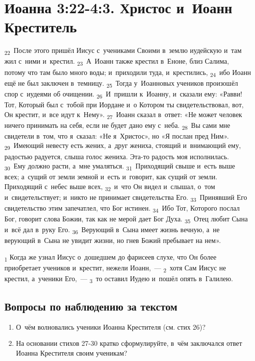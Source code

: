 \documentclass[a4paper,12pt]{article}
\begin{document}

\section{Иоанна 3:22-4:3. Христос и~Иоанн Креститель}

\textsubscript{22}~После этого пришёл Иисус с~учениками Своими в~землю иудейскую и~там жил с~ними и~крестил.
\textsubscript{23}~А~Иоанн также крестил в~Еноне, близ Салима, потому что там было много воды; и~приходили туда, и~крестились,
\textsubscript{24}~ибо Иоанн ещё не был заключен в~темницу.
\textsubscript{25}~Тогда у~Иоанновых учеников произошёл спор с~иудеями об очищении.
\textsubscript{26}~И~пришли к~Иоанну, и~сказали ему: «Равви! Тот, Который был с~тобой при Иордане и~о Котором ты свидетельствовал, вот, Он крестит, и~все идут к~Нему».
\textsubscript{27}~Иоанн сказал в~ответ: «Не может человек ничего принимать на себя, если не будет дано ему с~неба.
\textsubscript{28}~Вы сами мне свидетели в~том, что я~сказал: «Не я~Христос», но «Я послан пред Ним».
\textsubscript{29}~Имеющий невесту есть жених, а~друг жениха, стоящий и~внимающий ему, радостью радуется, слыша голос жениха. Эта-то радость моя исполнилась.
\textsubscript{30}~Ему должно расти, а~мне умаляться.
\textsubscript{31}~Приходящий свыше и~есть выше всех; а~сущий от земли земной и~есть и~говорит, как сущий от земли. Приходящий с~небес выше всех,
\textsubscript{32}~и~что Он видел и~слышал, о~том и~свидетельствует; и~никто не принимает свидетельства Его.
\textsubscript{33}~Принявший Его свидетельство этим запечатлел, что Бог истинен.
\textsubscript{34}~Ибо Тот, Которого послал Бог, говорит слова Божии, так как не мерой дает Бог Духа.
\textsubscript{35}~Отец любит Сына и~всё дал в~руку Его.
\textsubscript{36}~Верующий в~Сына имеет жизнь вечную, а~не верующий в~Сына не увидит жизни, но гнев Божий пребывает на нем».

\textsubscript{1} Когда же узнал Иисус о~дошедшем до фарисеев слухе, что Он более приобретает учеников и~крестит, нежели Иоанн,~---
\textsubscript{2}~хотя Сам Иисус не крестил, а~ученики Его,~---
\textsubscript{3}~то оставил Иудею и~пошёл опять в~Галилею. 

\subsection*{Вопросы по наблюдению за текстом}
\begin{enumerate}
    \item О~чём волновались ученики Иоанна Крестителя (см. стих 26)? 
    
    \myline
    
    \myline
    \item На основании стихов 27-30 кратко сформулируйте, в~чём заключался ответ Иоанна Крестителя своим ученикам?
    
    \myline
    
    \myline
\end{enumerate}
\end{document}
